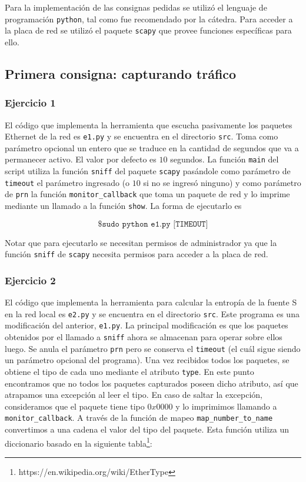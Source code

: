 Para la implementación de las consignas pedidas se utilizó el lenguaje de programación \texttt{python}, tal como
fue recomendado por la cátedra. Para acceder a la placa de red se utilizó el paquete \texttt{scapy} que provee
funciones específicas para ello.

\subsection{Primera consigna: capturando tráfico}

\subsubsection{Ejercicio 1}
El código que implementa la herramienta que escucha pasivamente los paquetes Ethernet de la red es \texttt{e1.py}
y se encuentra en el directorio \texttt{src}. Toma como parámetro opcional un entero que se traduce en la cantidad
de segundos que va a permanecer activo. El valor por defecto es $10$ segundos. La función \texttt{main} del script
utiliza la función \texttt{sniff} del paquete \texttt{scapy} pasándole como parámetro de \texttt{timeout} el
parámetro ingresado (o $10$ si no se ingresó ninguno) y como parámetro de \texttt{prn} la función
\texttt{monitor\_callback} que toma un paquete de red y lo imprime mediante un llamado a la función \texttt{show}.
La forma de ejecutarlo es

\[
\texttt{\$ sudo python e1.py [TIMEOUT]}
\]

Notar que para ejecutarlo se necesitan permisos de administrador ya que la función \texttt{sniff} de \texttt{scapy}
necesita permisos para acceder a la placa de red.

\subsubsection{Ejercicio 2}
El código que implementa la herramienta para calcular la entropía de la fuente S en la red local es \texttt{e2.py}
y se encuentra en el directorio \texttt{src}. Este programa es una modificación del anterior, \texttt{e1.py}.
La principal modificación es que los paquetes obtenidos por el llamado a \texttt{sniff} ahora se almacenan para
operar sobre ellos luego. Se anula el parámetro \texttt{prn} pero se conserva el \texttt{timeout} (el cuál sigue
siendo un parámetro opcional del programa). Una vez recibidos todos los paquetes, se obtiene el tipo de cada uno
mediante el atributo \texttt{type}. En este punto encontramos que no todos los paquetes capturados poseen dicho
atributo, así que atrapamos una excepción al leer el tipo. En caso de saltar la excepción, consideramos que el
paquete tiene tipo $0x0000$ y lo imprimimos llamando a \texttt{monitor\_callback}. A través de la función de
mapeo \texttt{map\_number\_to\_name} convertimos a una cadena el valor del tipo del paquete. Esta función
utiliza un diccionario basado en la siguiente tabla\footnote{https://en.wikipedia.org/wiki/EtherType}:

